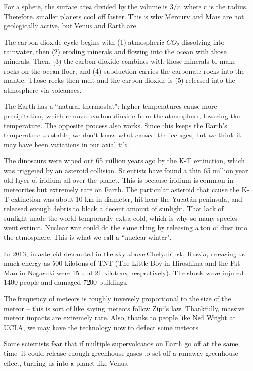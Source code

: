 \documentclass[class=article, crop=false]{standalone}
\begin{document}
\par
For a sphere, the surface area divided by the volume is $3/r$, where $r$ is the radius. Therefore, smaller planets cool off faster. This is why Mercury and Mars are not geologically active, but Venus and Earth are.
\bigskip
\par
The carbon dioxide cycle begins with (1) atmospheric $CO_2$ dissolving into rainwater, then (2) eroding minerals and flowing into the ocean with those minerals. Then, (3) the carbon dioxide combines with those minerals to make rocks on the ocean floor, and (4) subduction carries the carbonate rocks into the mantle. Those rocks then melt and the carbon dioxide is (5) released into the atmosphere via volcanoes.
\par
The Earth has a ``natural thermostat": higher temperatures cause more precipitation, which removes carbon dioxide from the atmosphere, lowering the temperature. The opposite process also works. Since this keeps the Earth's temperature so stable, we don't know what caused the ice ages, but we think it may have been variations in our axial tilt.
\par
The dinosaurs were wiped out 65 million years ago by the K-T extinction, which was triggered by an asteroid collision. Scientists have found a thin 65 million year old layer of iridium all over the planet. This is because iridium is common in meteorites but extremely rare on Earth. The particular asteroid that cause the K-T extinction was about 10 km in diameter, hit hear the Yucatán peninsula, and released enough debris to block a decent amount of sunlight. That lack of sunlight made the world temporarily extra cold, which is why so many species went extinct. Nuclear war could do the same thing by releasing a ton of dust into the atmosphere. This is what we call a ``nuclear winter".
\par
In 2013, in asteroid detonated in the sky above Chelyabinsk, Russia, releasing as much energy as 500 kilotons of TNT (The Little Boy in Hiroshima and the Fat Man in Nagasaki were 15 and 21 kilotons, respectively). The shock wave injured 1400 people and damaged 7200 buildings.
\par
The frequency of meteors is roughly inversely proportional to the size of the meteor -- this is sort of like saying meteors follow Zipf's law. Thankfully, massive meteor impacts are extremely rare. Also, thanks to people like Ned Wright at UCLA, we may have the technology now to deflect some meteors.
\par
Some scientists fear that if multiple supervolcanos on Earth go off at the same time, it could release enough greenhouse gases to set off a runaway greenhouse effect, turning us into a planet like Venus.
\end{document}

